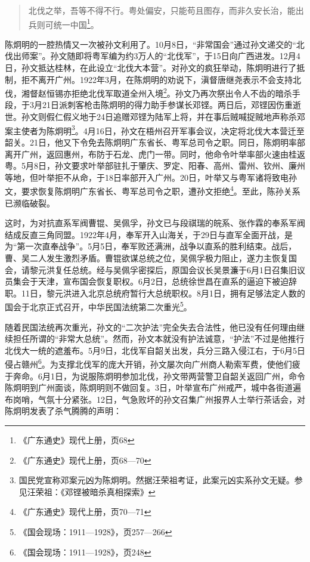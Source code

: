 \begin{quote}
北伐之举，吾等不得不行。粤处偏安，只能苟且图存，而非久安长治，能出兵则可统一中国\footnote{《广东通史》现代上册，页68}。
\end{quote}

陈炯明的一腔热情又一次被孙文利用了。10月8日，“非常国会”通过孙文递交的“北伐出师案”。孙文随即将粤军编为约3万人的“北伐军”，于15日向广西进发。12月4日，孙文抵达桂林，在此设立“北伐大本营”。对孙文的疯狂举动，陈炯明进行了抵制，拒不离开广州。1922年3月，在陈炯明的劝说下，滇督唐继尧表示不会支持北伐，湘督赵恒锡亦拒绝北伐军取道全州入境\footnote{《广东通史》现代上册，页68—70}。孙文乃再次祭出令人不齿的暗杀手段，于3月21日派刺客枪击陈炯明的得力助手参谋长邓铿。两日后，邓铿因伤重逝世。孙文则假仁假义地于24日追赠邓铿为陆军上将，并在事后贼喊捉贼地声称杀邓案主使者为陈炯明\footnote{国民党宣称邓案元凶为陈炯明。然据汪荣祖考证，此案元凶实系孙文无疑。参见汪荣祖：《邓铿被暗杀真相探索》}。4月16日，孙文在梧州召开军事会议，决定将北伐大本营迁至韶关。21日，他又下令免去陈炯明广东省长、粤军总司令之职。同日，陈炯明率部离开广州，返回惠州，布防于石龙、虎门一带。同时，他命令叶举率部火速由桂返粤。5月8日，孙文要求叶举部驻扎于肇庆、罗定、阳春、高州、雷州、钦州、廉州等地，但叶举拒不从命，于18日率部开入广州。20日，叶举又与粤军诸将致电孙文，要求恢复陈炯明广东省长、粤军总司令之职，遭孙文拒绝\footnote{《广东通史》现代上册，页70—71}。至此，陈孙关系已濒临破裂。

这时，为对抗直系军阀曹锟、吴佩孚，孙文已与段祺瑞的皖系、张作霖的奉系军阀结成反直三角同盟。1922年4月，奉军开入山海关，于29日与直军全面开战，是为“第一次直奉战争”。5月5日，奉军败还满洲，战争以直系的胜利结束。战后，曹、吴二人发生激烈矛盾。曹锟欲谋总统之位，吴佩孚极力阻止，遂力主恢复国会，请黎元洪复任总统。经与吴佩孚密探后，原国会议长吴景濂于6月1日召集旧议员集会于天津，宣布国会恢复职权。6月2日，总统徐世昌在直系的逼迫下被迫辞职。11日，黎元洪进入北京总统府暂行大总统职权。8月1日，拥有足够法定人数的国会于北京正式召开，中华民国法统第二次重光\footnote{《国会现场：1911—1928》，页257—266}。

随着民国法统再次重光，孙文的“二次护法”完全失去合法性，他已没有任何理由继续担任所谓的“非常大总统”。然而，孙文本就没有护法诚意，“护法”不过是他推行北伐大一统的遮羞布。5月9日，北伐军自韶关出发，兵分三路入侵江右，于6月5日侵占赣州\footnote{《国会现场：1911—1928》，页248}。为支撑北伐军的庞大开销，孙文屡次向广州商人勒索军费，使他们疲于奔命。6月1日，为说服陈炯明参加北伐，孙文带两营警卫自韶关返回广州，命令陈炯明到广州面谈，陈炯明则不做回复。3日，叶举宣布广州戒严，城中各街道遍布岗哨，气氛十分紧张。12日，气急败坏的孙文召集广州报界人士举行茶话会，对陈炯明发表了杀气腾腾的声明：

